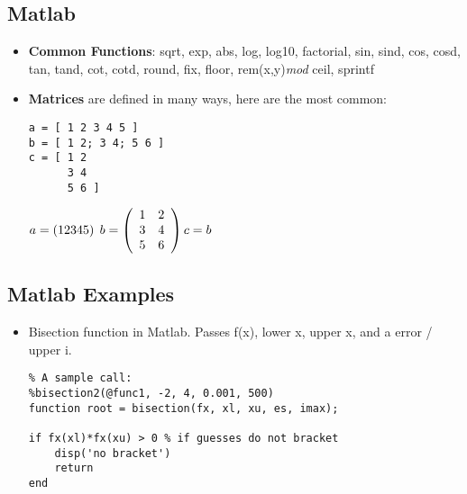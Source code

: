 \documentclass[fontsize=5pt]{scrartcl}
\begin{document}
\begin{multicols}{3}
    \subsection{Matlab}
      \begin{itemize}
        \item \textbf{Common Functions}:
          sqrt, 
          exp, 
          abs,  
          log, 
          log10, 
          factorial, 
          sin, 
          sind, 
          cos,  
          cosd, 
          tan, 
          tand, 
          cot, 
          cotd, 
          round, 
          fix, 
          floor, 
          rem(x,y)\textit{mod}
          ceil, 
          sprintf
        \item \textbf{Matrices} are defined in many ways, here are the most common:
          \lstset{language=Matlab}
          \begin{lstlisting}
a = [ 1 2 3 4 5 ]
b = [ 1 2; 3 4; 5 6 ]
c = [ 1 2
      3 4
      5 6 ]
          \end{lstlisting}%
          $%
          a = \left( 1 2 3 4 5 \right)\hspace{1mm}
          b = \left( \begin{array}{cc}
                      1 & 2 \\
                      3 & 4 \\ 
                      5 & 6 \\
                    \end{array}
                    \right)
          c = b
          $
        \end{itemize}
    \subsection{Matlab Examples}
      \begin{itemize}
        \item Bisection function in Matlab. Passes f(x), lower x, upper x, and a error / upper i.
        \lstset{language=Matlab}
        \begin{lstlisting}
% A sample call:
%bisection2(@func1, -2, 4, 0.001, 500)
function root = bisection(fx, xl, xu, es, imax);

if fx(xl)*fx(xu) > 0 % if guesses do not bracket
    disp('no bracket')
    return
end


\end{lstlisting}
\end{itemize}
\end{multicols}
\end{document}
